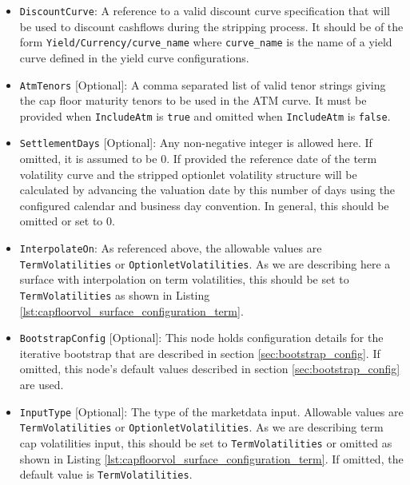 \begin{itemize}
\item \lstinline!DiscountCurve!:
A reference to a valid discount curve specification that will be used to discount cashflows during the stripping process. It should be of the form \lstinline!Yield/Currency/curve_name! where \lstinline!curve_name! is the name of a yield curve defined in the yield curve configurations.

\item \lstinline!AtmTenors! [Optional]:
A comma separated list of valid tenor strings giving the cap floor maturity tenors to be used in the ATM curve. It must be provided when \lstinline!IncludeAtm! is \lstinline!true! and omitted when \lstinline!IncludeAtm! is \lstinline!false!.

\item \lstinline!SettlementDays! [Optional]:
Any non-negative integer is allowed here. If omitted, it is assumed to be 0. If provided the reference date of the term volatility curve and the stripped optionlet volatility structure will be calculated by advancing the valuation date by this number of days using the configured calendar and business day convention. In general, this should be omitted or set to 0.

\item \lstinline!InterpolateOn!:
As referenced above, the allowable values are \lstinline!TermVolatilities! or \lstinline!OptionletVolatilities!. As we are describing here a surface with interpolation on term volatilities, this should be set to \lstinline!TermVolatilities! as shown in Listing \ref{lst:capfloorvol_surface_configuration_term}.

\item \lstinline!BootstrapConfig! [Optional]:
This node holds configuration details for the iterative bootstrap that are described in section \ref{sec:bootstrap_config}. If omitted, this node's default values described in section \ref{sec:bootstrap_config} are used.

\item \lstinline!InputType! [Optional]:
The type of the marketdata input. Allowable values are \lstinline!TermVolatilities! or \lstinline!OptionletVolatilities!. As we are describing term cap volatilities input, this should be set to \lstinline!TermVolatilities! or omitted as shown in Listing \ref{lst:capfloorvol_surface_configuration_term}. If omitted, the default value is \lstinline!TermVolatilities!.

\end{itemize}


